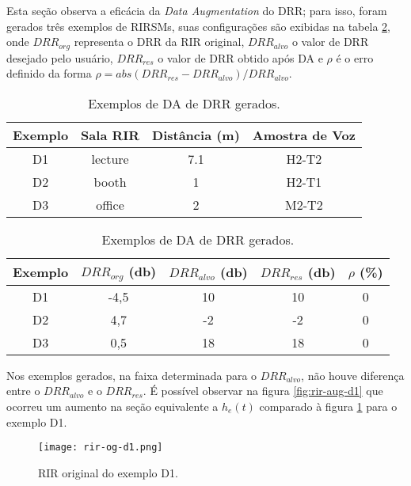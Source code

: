 Esta seção observa a eficácia da \textit{Data Augmentation} do DRR; para isso, foram gerados três exemplos de RIRSMs, suas configurações
são exibidas na tabela \ref{tbl:da-drr}, onde $DRR_{org}$ representa o DRR da RIR original, $DRR_{alvo}$ o valor de DRR desejado pelo usuário,
$DRR_{res}$ o valor de DRR obtido após DA e $\rho$ é o erro definido da forma $\rho = abs(DRR_{res} - DRR_{alvo})/DRR_{alvo}$.

\begin{table} [H]
    \centering
    \caption{Exemplos de DA de DRR gerados.}
    \label{tbl:da-drr}
    \begin{tabular}{c|c|c|c}

        \textbf{Exemplo} & 
        \textbf{Sala RIR} & 
        \textbf{Distância (m)} &
        \textbf{Amostra de Voz} \\
        \hline 

        D1 & lecture & 7.1 & H2-T2 \\
        D2 & booth & 1 & H2-T1 \\
        D3 & office & 2 & M2-T2 \\

    \end{tabular}
    \bigbreak
    \bigbreak
    \begin{tabular}{c|c|c|c|c}

        \textbf{Exemplo} & 
        \textbf{$DRR_{org}$ (db)} & 
        \textbf{$DRR_{alvo}$ (db)} &
        \textbf{$DRR_{res}$ (db)} & 
        \textbf{$\rho$ (\%)} \\
        \hline 

        D1 & -4,5 & 10 & 10 & 0 \\
        D2 & 4,7 & -2 & -2 & 0 \\
        D3 & 0,5 & 18 & 18 & 0 \\

    \end{tabular}
\end{table}


Nos exemplos gerados, na faixa determinada para o $DRR_{alvo}$, não houve diferença entre o $DRR_{alvo}$ e o $DRR_{res}$.
É possível observar na figura \ref{fig:rir-aug-d1} que ocorreu um aumento na seção equivalente a $h_e(t)$ comparado à figura \ref{fig:rir-og-d1}
para o exemplo D1.

\begin{figure} [H]
    \centering
    \texttt{[image: rir-og-d1.png]}
    \caption{RIR original do exemplo D1.}
    \label{fig:rir-og-d1}
\end{figure} 

